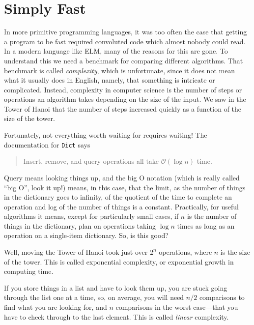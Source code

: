 \documentclass[12pt]{amsbook}
\begin{document}
\section{Simply Fast}
%
In more primitive programming languages, 
it was too often the case that getting a program to be fast 
required convoluted code which almost nobody could read.
In a modern language like ELM, many of the reasons for this are gone.
To understand this we need a benchmark for comparing different algorithms.
That benchmark is called \emph{complexity}, 
which is unfortunate, since it does not mean what it usually does in English,
namely, that something is intricate or complicated.
Instead, complexity in computer science is the number of steps or operations an algorithm takes depending on the size of the input.
We saw in the Tower of Hanoi that the number of steps increased quickly as a function of the size of the tower.

Fortunately, not everything worth waiting for requires waiting!
The documentation for \texttt{Dict} says
\begin{quote}
Insert, remove, and query operations all take $\mathcal{O}(\log n)$ time.
\end{quote}
Query means looking things up,
and the big O notation (which is really called ``big O'', look it up!)
means, in this case, that the limit, as the number of things in the dictionary goes to infinity, of the quotient of the time to complete an operation and log of the number of things is a constant.
Practically, for useful algorithms it means,
except for particularly small cases,
if $n$ is the number of things in the dictionary, 
plan on operations taking $\log n$ times as long as an operation on a single-item dictionary.
So, is this good?

Well, moving the Tower of Hanoi took just over $2^n$ operations, where $n$ is the size of the tower.
This is called exponential complexity, or exponential growth in computing time.

If you store things in a list and have to look them up, 
you are stuck going through the list one at a time,
so, on average, you will need $n/2$ comparisons to find what you are looking for,
and $n$ comparisons in the worst case---that you have to check through to the last element.  This is called \emph{linear} complexity.
\end{document}
